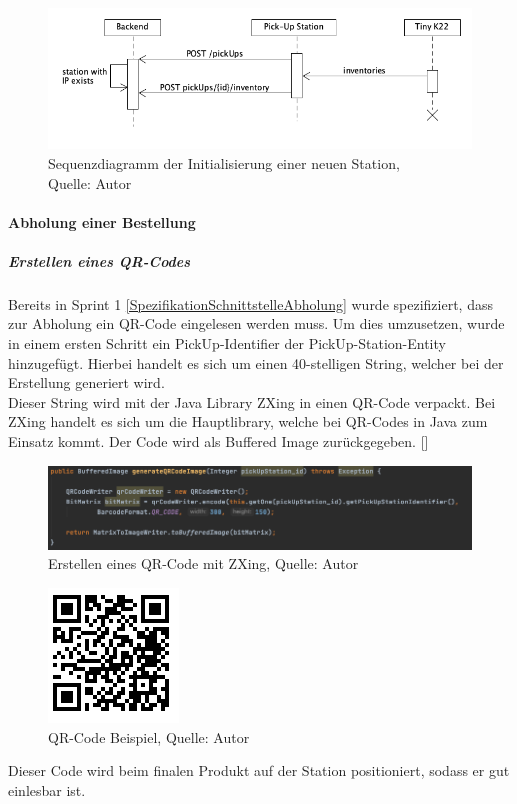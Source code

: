  \begin{figure}[H]
	\centering
	\includegraphics[width=1\textwidth]{images/stationInit.PNG}
	\caption[Sequenzdiagramm der Initialisierung einer neuen Station]{Sequenzdiagramm der Initialisierung einer neuen Station,\\ Quelle: Autor}
	\label{img: stationInitSequence}
\end{figure} 
\paragraph{Abholung einer Bestellung}
\subparagraph{Erstellen eines QR-Codes}
Bereits in Sprint 1 \ref{SpezifikationSchnittstelleAbholung} wurde spezifiziert, dass zur Abholung ein QR-Code eingelesen werden muss. Um dies umzusetzen, wurde in einem ersten Schritt ein PickUp-Identifier der PickUp-Station-Entity hinzugefügt. Hierbei handelt es sich um einen 40-stelligen String, welcher bei der Erstellung generiert wird. \\
Dieser String wird mit der Java Library ZXing in einen QR-Code verpackt. Bei ZXing handelt es sich um die Hauptlibrary, welche bei QR-Codes in Java zum Einsatz kommt. Der Code wird als Buffered Image zurückgegeben. 
[\cite{qrCodeCreation}]
\begin{figure}[H]
	\centering
	\includegraphics[width=1\textwidth]{images/qrCodeCreation.PNG}
	\caption[Erstellen eines QR-Code mit ZXing]{Erstellen eines QR-Code mit ZXing, Quelle: Autor}
	\label{img: qrCodeCreation}
\end{figure} 
\begin{figure}[H]
	\centering
	\includegraphics[scale=0.4]{images/qrCodeExample.PNG}
	\caption[QR-Code Beispiel]{QR-Code Beispiel, Quelle: Autor}
	\label{img: qrCodeExample}
\end{figure} 
Dieser Code wird beim finalen Produkt auf der Station positioniert, sodass er gut einlesbar ist. 

